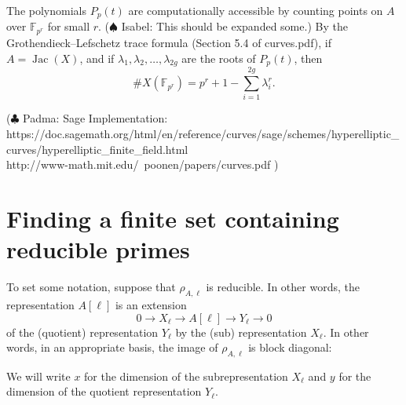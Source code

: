 \documentclass[11pt]{amsart}
\newcommand{\ff}{\mathbb{F}}
\newcommand{\Jac}{\operatorname{Jac}}
\newcommand{\isabel}[1]{{\color{purple} ($\spadesuit$ Isabel: #1)}}
\newcommand{\padma}[1]{{\color{teal} ($\clubsuit$ Padma: #1)}}
\theoremstyle{definition}
\theoremstyle{remark}
\begin{document}
The polynomials $P_p(t)$ are computationally accessible by counting points on $A$ over $\ff_{p^r}$ for small $r$.  \isabel{This should be expanded some.}  
By the Grothendieck--Lefschetz trace formula (Section 5.4 of curves.pdf), if $A= \Jac(X)$, and if $\lambda_1,\lambda_2,\ldots,\lambda_{2g}$ are the roots of $P_p(t)$, then
\[ \# X(\ff_{p^r}) = p^r+1-\sum_{i=1}^{2g} \lambda_i^r. \]

\padma{Sage Implementation: \\

https://doc.sagemath.org/html/en/reference/curves/sage/schemes/hyperelliptic\_curves/hyperelliptic\_finite\_field.html \\

http://www-math.mit.edu/~poonen/papers/curves.pdf }

\section{Finding a finite set containing reducible primes}\label{finite_list}

To set some notation, suppose that $\rho_{A, \ell}$ is reducible.  In other words, the representation $A[\ell]$ is an extension
\begin{equation}\label{red_extn} 0 \to X_\ell \to A[\ell] \to Y_\ell \to 0\end{equation}
of the (quotient) representation $Y_\ell$ by the (sub) representation $X_\ell$.
In other words, in an appropriate basis, the image of $\rho_{A, \ell}$ is block diagonal:

\begin{center}
\end{center}

We will write $x$ for the dimension of the subrepresentation $X_\ell$ and $y$ for the dimension of the quotient representation $Y_\ell$.
\end{document}
